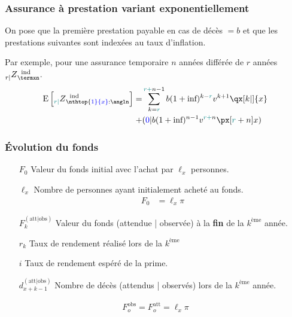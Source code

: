 \documentclass[10pt, french]{article}
\begin{document}
\begin{multicols*}{3}
\subsubsection*{\textcolor{amber(sae/ece)}{Assurance à prestation variant exponentiellement}}
On pose que la première prestation payable en cas de décès $= b$ et que les prestations suivantes  sont indexées au taux d'inflation.

Par exemple, pour une assurance temporaire $n$ années différée de $r$ années $\prescript{}{r|}{Z}_{\termxn}^{\;\; \text{ind}}$.\\
\begin{align*}
	\esp{\prescript{}{\color{teal}r|}Z_{\nthtop{\color{blue}1}{x}:\angln}^{\;\; \text{ind}}} = 
	&\sum\limits_{ k = {\color{teal}r }}^{{\color{teal} r + }n - 1} b (1 + \text{inf})^{k - {\color{teal}r }} v^{k + 1} \qx[k|]{x}  \\
	+ &({\color{blue}0}|b (1 + \text{inf})^{n - 1}v^{{\color{teal}r +}n} \px[ {\color{teal}r} +n ]{x})
\end{align*}



\subsubsection*{\textcolor{amber(sae/ece)}{Évolution du fonds}}
\begin{enumerate}
	\item[$F_0$] Valeur du fonds initial avec l'achat par $\ell_x$ personnes.
	\item[$\ell_x$] Nombre de personnes ayant initialement acheté au fonds.
	\begin{align*}
		F_0 &= \ell_x \pi 
	\end{align*}
	\item[$F_k^{(\text{att}|\text{obs})}$] Valeur du fonds (attendue | observée) à la \textbf{fin} de la $k^{\text{ème}}$ année.
	\item[$r_k$] Taux de rendement réalisé lors de la $k^{\text{ème}}$
	\item[$i$] Taux de rendement espéré de la prime. 
	\item[$d_{x + k - 1}^{(\text{att}|\text{obs})} $] Nombre de décès (attendus | observés) lors de la $k^{\text{ème}}$ année.
\end{enumerate}

\begin{align*}
	F_o^{\text{obs}} = F_o^{\text{att}} = \ell_x \pi 
\end{align*}


\end{multicols*}
\end{document}
